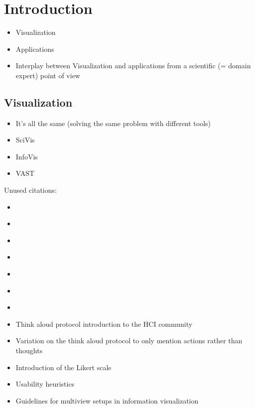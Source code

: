 \chapter{Introduction}
\label{ch:introduction}

\begin{itemize}
\item Visualization
\item Applications
\item Interplay between Visualization and applications from a scientific (= domain expert) point of view
\end{itemize}

\section{Visualization}
\begin{itemize}
\item It's all the same (solving the same problem with different tools)
\item SciVis
\item InfoVis
\item VAST
\end{itemize}

Unused citations:
\begin{itemize}
\item \cite{tory2005evaluating}
\item \cite{munzner2009nested}
\item \cite{tory2004human}
\item \cite{kirby2013visualization}
\item \cite{van2006bridging}
\item \cite{kosara2003thoughts}
\item \cite{carpendale2008evaluating}

\item \cite{lewis1993task} Think aloud protocol introduction to the HCI community
\item \cite{ericsson1980verbal} Variation on the think aloud protocol to only mention actions rather than thoughts
\item \cite{likert1932technique} Introduction of the Likert scale
\item \cite{nielsen1994heuristic} Usability heuristics
\item \cite{wang2000guidelines} Guidelines for multiview setups in information visualization
\end{itemize}